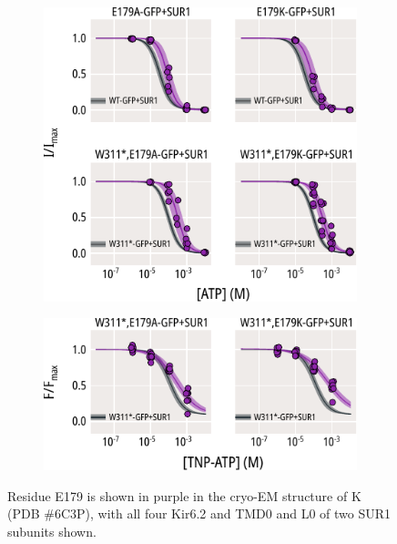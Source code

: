 \begin{figure}[hbtp]
\begin{subfigure}[t]{0.45\textwidth}
	\end{subfigure}
	\vfill
	\begin{subfigure}[t]{0.45\textwidth}
		\caption{}\label{ch5fig:e179_atp_popfits}
		\centering
		\includegraphics[width=\textwidth]{e179_2.pdf}
	\end{subfigure}
	\hfill
	\begin{subfigure}[t]{0.45\textwidth}
		\caption{}\label{ch5fig:e179_tnpatp_popfits_2}
		\centering
		\includegraphics[width=\textwidth]{e179_4.pdf}
	\end{subfigure}
	\caption[Functional effects of E179 mutations]{
	{\bf{}}
	 Residue E179 is shown in purple in the cryo-EM structure of K\ATP{} (PDB \#6C3P), with all four Kir6.2 and TMD0 and L0 of two SUR1 subunits shown.
}
\end{figure}
